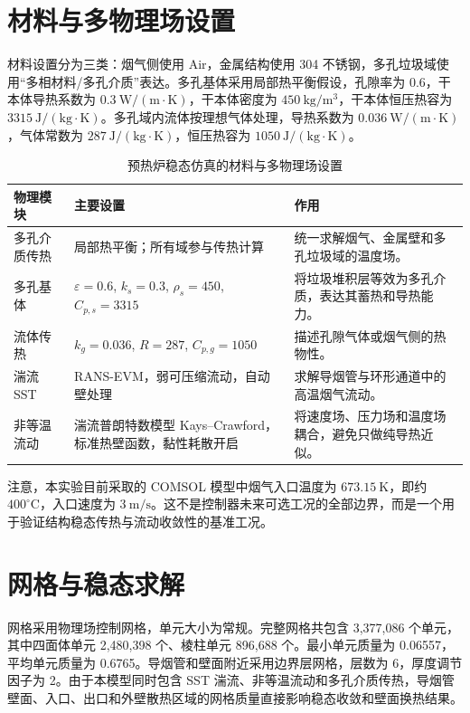 \documentclass[UTF8,openany,zihao=-4,oneside]{ctexbook}
\begin{document}
\section{材料与多物理场设置}

材料设置分为三类：烟气侧使用 Air，金属结构使用 304 不锈钢，多孔垃圾域使用“多相材料/多孔介质”表达。多孔基体采用局部热平衡假设，孔隙率为 0.6，干本体导热系数为 \(0.3\ \mathrm{W/(m\cdot K)}\)，干本体密度为 \(450\ \mathrm{kg/m^3}\)，干本体恒压热容为 \(3315\ \mathrm{J/(kg\cdot K)}\)。多孔域内流体按理想气体处理，导热系数为 \(0.036\ \mathrm{W/(m\cdot K)}\)，气体常数为 \(287\ \mathrm{J/(kg\cdot K)}\)，恒压热容为 \(1050\ \mathrm{J/(kg\cdot K)}\)。

\begin{table}[htbp]
\centering\small
\begin{tabularx}{\textwidth}{p{31mm}p{46mm}X}
\toprule
物理模块 & 主要设置 & 作用 \\
\midrule
多孔介质传热 & 局部热平衡；所有域参与传热计算 & 统一求解烟气、金属壁和多孔垃圾域的温度场。 \\
多孔基体 & \(\varepsilon=0.6\), \(k_s=0.3\), \(\rho_s=450\), \(C_{p,s}=3315\) & 将垃圾堆积层等效为多孔介质，表达其蓄热和导热能力。 \\
流体传热 & \(k_g=0.036\), \(R=287\), \(C_{p,g}=1050\) & 描述孔隙气体或烟气侧的热物性。 \\
湍流 SST & RANS-EVM，弱可压缩流动，自动壁处理 & 求解导烟管与环形通道中的高温烟气流动。 \\
非等温流动 & 湍流普朗特数模型 Kays--Crawford，标准热壁函数，黏性耗散开启 & 将速度场、压力场和温度场耦合，避免只做纯导热近似。 \\
\bottomrule
\end{tabularx}
\caption{预热炉稳态仿真的材料与多物理场设置}
\end{table}

注意，本实验目前采取的 COMSOL 模型中烟气入口温度为 \(673.15\ \mathrm{K}\)，即约 \(400^\circ\mathrm{C}\)，入口速度为 \(3\ \mathrm{m/s}\)。这不是控制器未来可选工况的全部边界，而是一个用于验证结构稳态传热与流动收敛性的基准工况。

\section{网格与稳态求解}

网格采用物理场控制网格，单元大小为常规。完整网格共包含 3,377,086 个单元，其中四面体单元 2,480,398 个、棱柱单元 896,688 个。最小单元质量为 0.06557，平均单元质量为 0.6765。导烟管和壁面附近采用边界层网格，层数为 6，厚度调节因子为 2。由于本模型同时包含 SST 湍流、非等温流动和多孔介质传热，导烟管壁面、入口、出口和外壁散热区域的网格质量直接影响稳态收敛和壁面换热结果。
\end{document}
